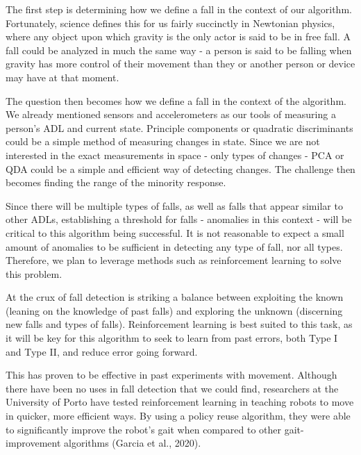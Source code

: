 \documentclass{llncs}
\begin{document}
	The first step is determining how we define a fall in the context of our algorithm. Fortunately, science defines this for us fairly succinctly in Newtonian physics, where any object upon which gravity is the only actor is said to be in free fall. A fall could be analyzed in much the same way - a person is said to be falling when gravity has more control of their movement than they or another person or device may have at that moment.
	
	The question then becomes how we define a fall in the context of the algorithm. We already mentioned sensors and accelerometers as our tools of measuring a person's ADL and current state. Principle components or quadratic discriminants could be a simple method of measuring changes in state. Since we are not interested in the exact measurements in space - only types of changes - PCA or QDA could be a simple and efficient way of detecting changes. The challenge then becomes finding the range of the minority response.
	
	Since there will be multiple types of falls, as well as falls that appear similar to other ADLs, establishing a threshold for falls - anomalies in this context - will be critical to this algorithm being successful. It is not reasonable to expect a small amount of anomalies to be sufficient in detecting any type of fall, nor all types. Therefore, we plan to leverage methods such as reinforcement learning to solve this problem.
	
	At the crux of fall detection is striking a balance between exploiting the known (leaning on the knowledge of past falls) and exploring the unknown (discerning new falls and types of falls). Reinforcement learning is best suited to this task, as it will be key for this algorithm to seek to learn from past errors, both Type I and Type II, and reduce error going forward.
	
	This has proven to be effective in past experiments with movement. Although there have been no uses in fall detection that we could find, researchers at the University of Porto have tested reinforcement learning in teaching robots to move in quicker, more efficient ways. By using a policy reuse algorithm, they were able to significantly improve the robot's gait when compared to other gait-improvement algorithms (Garcia et al., 2020).\cite{garcia2020teaching}
	
\end{document}
